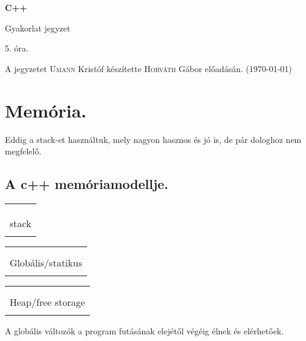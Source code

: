 \documentclass[a4paper,11.5pt]{article}
\begin{document}
	\setlength\parindent{0pt}
	\def\s{\hspace{0.2mm}\vphantom{\beta}}
	\def\Z{\mathbb{Z}}
	\def\Q{\mathbb{Q}}
	\def\R{\mathbb{R}}
	\def\C{\mathbb{C}}
	\def\N{\mathbb{N}}
	\def\Ra{\overline{\mathbb{R}}}
	
	\def\sume{\displaystyle\sum_{n=1}^{+\infty}}
	\def\sumn{\displaystyle\sum_{n=0}^{+\infty}}
	
	\def\narrow{\underset{n\rightarrow+\infty}{\longrightarrow}}
	\def\limn{\displaystyle\lim_{n\to +\infty}}
	\def\limx{\displaystyle\lim_{x\to +\infty}}
	
	\theoremstyle{definition}
	\newtheorem{theorem}{Tétel}[subsection] 
	
	\theoremstyle{definition}
	\newtheorem{definition}[theorem]{Definíció} 
	\newtheorem{example}[theorem]{Példa} 
	\newtheorem{task}[theorem]{Feladat} 
	\newtheorem{note}[theorem]{Megjegyzés}
	\begin{center}
		{\LARGE\textbf{C++}}
		
		{\Large Gyakorlat jegyzet}
		
		5. óra.
	\end{center}
	A jegyzetet \textsc{Umann} Kristóf készítette \textsc{Horváth} Gábor  előadásán. (\today)
	\section{Memória.}
	Eddig a stack-et használtuk, mely nagyon hasznos és jó is, de pár dologhoz nem megfelelő.
	\subsection{A c++ memóriamodellje.}
	\begin{center}
		\begin{tabular}{|c|}
			\\
			\\
			\\
			\\
			stack\\
			\\
			\hline
		\end{tabular}\quad 
		\begin{tabular}{|c|}
			\hline
			\quad \quad \\
			\\
			Globális/statikus\\
			\\
			\hline
		\end{tabular}\quad 
		\begin{tabular}{|c|}
			\hline
			\quad \quad \\
			\\
			Heap/free storage\\
			\\
			\hline
		\end{tabular}
	\end{center}
	A globális változók a program futásának elejétől végéig élnek és elérhetőek.
	
\end{document}
